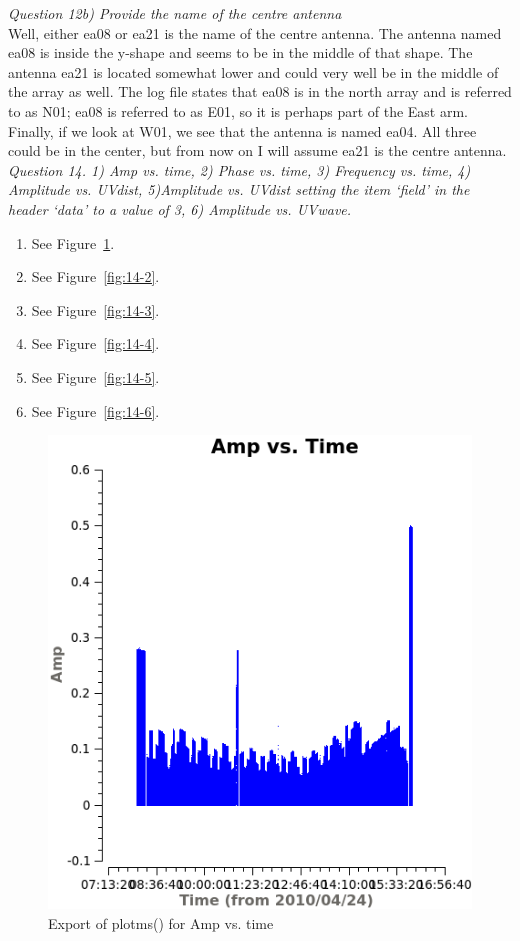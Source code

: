 \documentclass[12pt, a4paper]{article}
\begin{document}
\noindent \textit{Question 12b) Provide the name of the centre antenna} \\
Well, either ea08 or ea21 is the name of the centre antenna. The antenna named ea08 is inside the y-shape and seems to be in the middle of that shape. The antenna ea21 is located somewhat lower and could very well be in the middle of the array as well. The log file states that ea08 is in the north array and is referred to as N01; ea08 is referred to as E01, so it is perhaps part of the East arm. Finally, if we look at W01, we see that the antenna is named ea04. All three could be in the center, but from now on I will assume ea21 is the centre antenna. \\


\noindent \textit{Question 14. 1) Amp vs. time, 2) Phase vs. time, 3) Frequency vs. time, 4) Amplitude vs. UVdist, 5)Amplitude vs. UVdist setting the item `field' in the header `data' to a value of 3, 6) Amplitude vs. UVwave.}
\begin{enumerate}
    \item See Figure~\ref{fig:14-1}.
    \item See Figure~\ref{fig:14-2}.
    \item See Figure~\ref{fig:14-3}.
    \item See Figure~\ref{fig:14-4}.
    \item See Figure~\ref{fig:14-5}.
    \item See Figure~\ref{fig:14-6}.
\end{enumerate}

\newpage

\begin{figure}[h!]
    \centering
    \includegraphics[scale=0.65]{../Imaging/plots/amp_vs_time_vraag14-1.png}
    \caption{Export of plotms() for Amp vs. time \label{fig:14-1}}
\end{figure}
\end{document}
